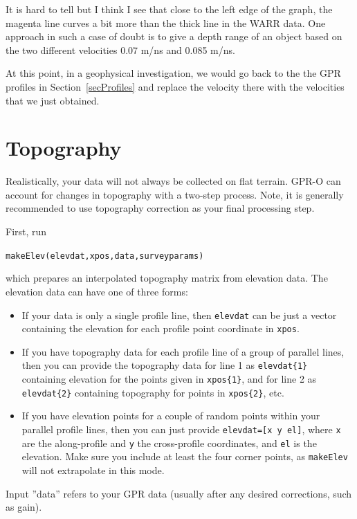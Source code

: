 \documentclass[11pt]{article}
\begin{document}
It is hard to tell but I think I see that close to the left edge of
the graph, the magenta line curves a bit more than the thick line in
the WARR data.  One approach in such a case of doubt is to give a
depth range of an object based on the two different velocities 0.07
m/ns and 0.085 m/ns.

At this point, in a geophysical investigation, we would go back to the
the GPR profiles in Section~\ref{secProfiles} and replace the velocity
there with the velocities that we just obtained.

\section{Topography}

Realistically, your data will not always be collected on flat terrain. 
GPR-O can account for changes in topography with a two-step process. Note,
it is generally recommended to use topography correction as your final
processing step.

First, run

\qquad \verb#makeElev(elevdat,xpos,data,surveyparams)#

which prepares an interpolated topography matrix from elevation
data. The elevation data can have one of three forms:
\begin{itemize}
\item If your data is only a single profile line, then \verb#elevdat# can be
  just a vector containing the elevation for each profile point
  coordinate in \verb#xpos#.
\item If you have topography data for each profile line of a group of
  parallel lines, then you can provide the topography data for line 1 as
  \verb#elevdat{1}# containing elevation for the points given in
  \verb#xpos{1}#, and for line 2 as \verb#elevdat{2}# containing
  topography for points in \verb#xpos{2}#, etc.
\item If you have elevation points for a couple of random points
  within your parallel profile lines, then you can just provide
  \verb#elevdat=[x y el]#, where \verb#x# are the along-profile and
  \verb#y# the cross-profile coordinates, and \verb#el# is the
  elevation. Make sure you include at least the four corner points, as
  \verb#makeElev# will not extrapolate in this mode.
\end{itemize}

Input ''data'' refers to your GPR data (usually after any desired corrections, such as gain).
\end{document}
